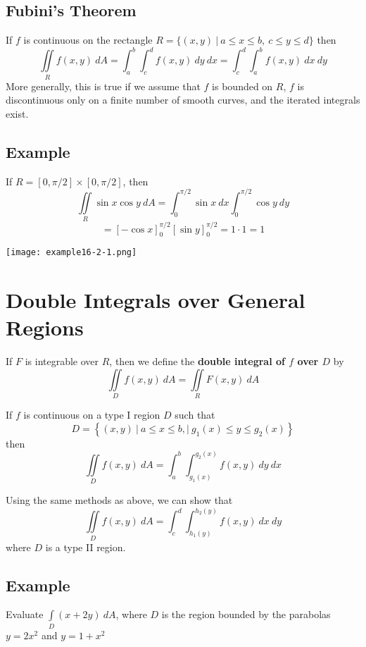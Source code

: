\subsection*{Fubini's Theorem}
If $f$ is continuous on the rectangle $R=\{(x,y)\:|\:a\leq x\leq b,\: c\leq y\leq d\}$ then
$$\iint\limits_R f(x,y)\: dA=\int_a^b\int_c^d f(x,y)\:dy\:dx=\int_c^d\int_a^b f(x,y)\:dx\:dy$$
More generally, this is true if we assume that $f$ is bounded on $R$, $f$ is discontinuous
only on a finite number of smooth curves, and the iterated integrals exist.

\subsection*{Example}
If $R=[0,\pi/2]\times[0,\pi/2]$, then
$$\iint\limits_R \sin{x}\cos{y}\:dA=\int_0^{\pi/2}\sin{x}\:dx\int_0^{\pi/2}\cos{y}\:dy$$
$$=[-\cos{x}]_0^{\pi/2}[\sin{y}]_0^{\pi/2}=1\cdot 1=1$$
\begin{center}
    \texttt{[image: example16-2-1.png]}
\end{center}

\section{Double Integrals over General Regions}

If $F$ is integrable over $R$, then we define the \textbf{double integral of $f$ over $D$} by
$$\iint\limits_D f(x,y)\:dA=\iint\limits_R F(x,y)\:dA$$

If $f$ is continuous on a type I region $D$ such that
$$D=\left\{(x,y)\:|\: a\leq x\leq b,|\: g_1(x)\leq y\leq g_2(x)\right\}$$
then
$$\iint\limits_D f(x,y)\:dA=\int_a^b\int_{g_1(x)}^{g_2(x)}f(x,y)\:dy\:dx$$

Using the same methods as above, we can show that
$$\iint\limits_D f(x,y)\:dA=\int_c^d\int_{h_1(y)}^{h_2(y)}f(x,y)\:dx\:dy$$
where $D$ is a type II region.

\subsection*{Example}
Evaluate $\int\limits_D (x+2y)\:dA$, where $D$ is the region bounded by the parabolas
$y=2x^2$ and $y=1+x^2$

